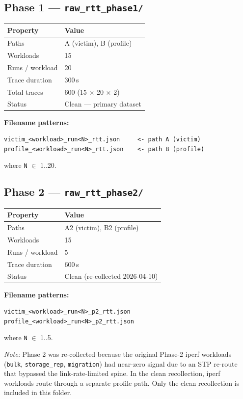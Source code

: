 \documentclass[11pt,a4paper]{article}
\begin{document}
\subsection{Phase 1 --- \texttt{raw\_rtt\_phase1/}}

\begin{tabular}{@{}ll@{}}
\toprule
\textbf{Property} & \textbf{Value} \\
\midrule
Paths              & A (victim), B (profile) \\
Workloads          & 15 \\
Runs / workload    & 20 \\
Trace duration     & 300\,s \\
Total traces       & 600 (15 $\times$ 20 $\times$ 2) \\
Status             & Clean --- primary dataset \\
\bottomrule
\end{tabular}

\textbf{Filename patterns:}
\begin{lstlisting}
victim_<workload>_run<N>_rtt.json     <- path A (victim)
profile_<workload>_run<N>_rtt.json    <- path B (profile)
\end{lstlisting}
where \texttt{N} $\in$ 1..20.

\subsection{Phase 2 --- \texttt{raw\_rtt\_phase2/}}

\begin{tabular}{@{}ll@{}}
\toprule
\textbf{Property} & \textbf{Value} \\
\midrule
Paths           & A2 (victim), B2 (profile) \\
Workloads       & 15 \\
Runs / workload & 5 \\
Trace duration  & 600\,s \\
Status          & Clean (re-collected 2026-04-10) \\
\bottomrule
\end{tabular}

\textbf{Filename patterns:}
\begin{lstlisting}
victim_<workload>_run<N>_p2_rtt.json
profile_<workload>_run<N>_p2_rtt.json
\end{lstlisting}
where \texttt{N} $\in$ 1..5.

\textit{Note:} Phase 2 was re-collected because the original Phase-2 iperf
workloads (\texttt{bulk}, \texttt{storage\_rep}, \texttt{migration}) had
near-zero signal due to an STP re-route that bypassed the link-rate-limited
spine. In the clean recollection, iperf workloads route through a separate
profile path. Only the clean recollection is included in this folder.
\end{document}
